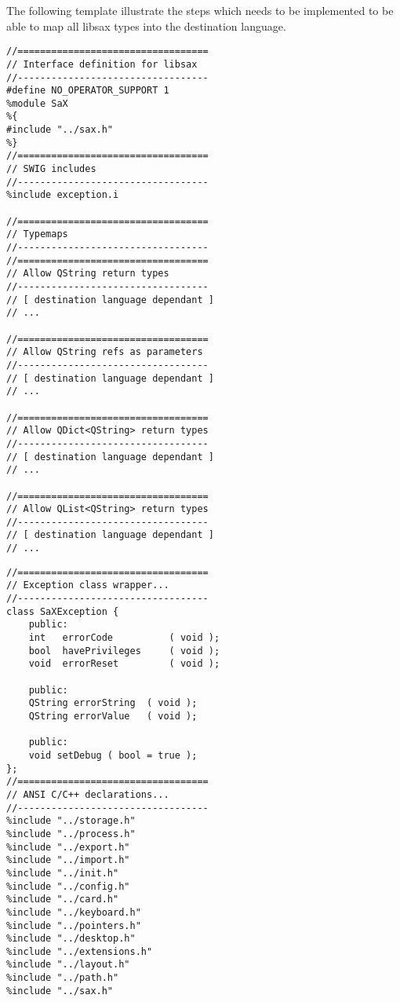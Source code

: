The following template illustrate the steps which needs to be
implemented to be able to map all libsax types into the destination
language.

\begin{Command}{12cm}
\begin{small}
\begin{verbatim}
//==================================
// Interface definition for libsax
//----------------------------------
#define NO_OPERATOR_SUPPORT 1
%module SaX
%{
#include "../sax.h"
%}
//==================================
// SWIG includes
//----------------------------------
%include exception.i

//==================================
// Typemaps
//----------------------------------
//==================================
// Allow QString return types
//----------------------------------
// [ destination language dependant ]
// ...

//==================================
// Allow QString refs as parameters
//----------------------------------
// [ destination language dependant ]
// ...

//==================================
// Allow QDict<QString> return types
//----------------------------------
// [ destination language dependant ]
// ...

//==================================
// Allow QList<QString> return types
//----------------------------------
// [ destination language dependant ]
// ...

\end{verbatim}
\end{small}
\end{Command}

\newpage

\begin{Command}{12cm}
\begin{small}
\begin{verbatim}
//==================================
// Exception class wrapper...
//----------------------------------
class SaXException {
    public:
    int   errorCode          ( void );
    bool  havePrivileges     ( void );
    void  errorReset         ( void );

    public:
    QString errorString  ( void );
    QString errorValue   ( void );

    public:
    void setDebug ( bool = true );
};
//==================================
// ANSI C/C++ declarations...
//----------------------------------
%include "../storage.h"
%include "../process.h"
%include "../export.h"
%include "../import.h"
%include "../init.h"
%include "../config.h"
%include "../card.h"
%include "../keyboard.h"
%include "../pointers.h"
%include "../desktop.h"
%include "../extensions.h"
%include "../layout.h"
%include "../path.h"
%include "../sax.h"
\end{verbatim}
\end{small}
\end{Command}

